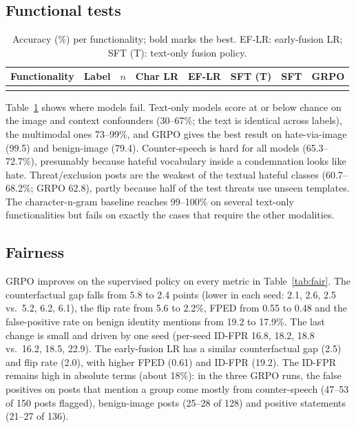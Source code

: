 \documentclass[11pt]{article}
\begin{document}
\subsection{Functional tests}
\begin{table}[t]
\centering\small\setlength{\tabcolsep}{4pt}
\begin{tabular}{lccccccc}
\toprule
Functionality & Label & $n$ & Char LR & EF-LR & SFT (T) & SFT & GRPO \\
\midrule
\\
\bottomrule
\end{tabular}
\caption{Accuracy (\%) per functionality; bold marks the best. EF-LR: early-fusion LR; SFT (T): text-only fusion policy.}
\label{tab:func}
\end{table}
Table~\ref{tab:func} shows where models fail. Text-only models score at or below chance on the image and context confounders (30--67\%; the text is identical
across labels), the multimodal ones 73--99\%, and GRPO gives the best result on hate-via-image (99.5) and benign-image (79.4). Counter-speech is hard for all models
(65.3--72.7\%), presumably because hateful vocabulary inside a condemnation looks like hate. Threat/exclusion posts are the weakest of the textual hateful classes (60.7--68.2\%; GRPO 62.8), partly because
half of the test threats use unseen templates. The character-n-gram baseline reaches 99--100\% on several
text-only functionalities but fails on exactly the cases that require the other modalities.

\subsection{Fairness}
GRPO improves on the supervised policy on every metric in Table~\ref{tab:fair}. The counterfactual gap falls from 5.8 to 2.4 points (lower in each seed: 2.1, 2.6, 2.5 vs.\ 5.2, 6.2, 6.1),
the flip rate from 5.6 to 2.2\%, FPED from 0.55 to 0.48 and the false-positive rate on benign identity mentions from 19.2 to 17.9\%. The last change is small and driven by one seed (per-seed ID-FPR 16.8, 18.2, 18.8 vs.\ 16.2, 18.5, 22.9).
The early-fusion LR has a similar counterfactual gap (2.5) and flip rate (2.0), with higher FPED (0.61) and ID-FPR (19.2). The ID-FPR remains high in absolute terms (about 18\%): in the three GRPO runs, the false positives on posts that
mention a group come mostly from counter-speech (47--53 of 150 posts flagged), benign-image posts (25--28 of 128) and positive statements (21--27 of 136).
\end{document}
